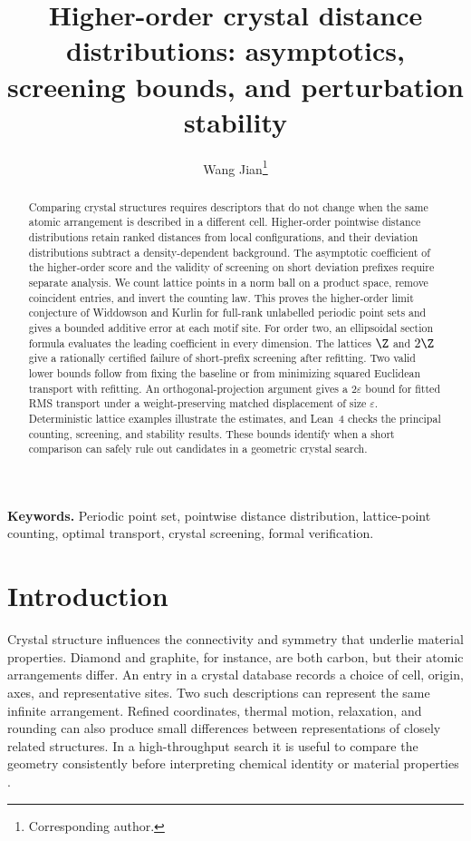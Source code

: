 \documentclass[11pt,a4paper]{article}
\title{Higher-order crystal distance distributions: asymptotics, screening bounds, and perturbation stability}
\author{Wang Jian\thanks{Corresponding author.}}
\date{}
\theoremstyle{definition}
\begin{document}
\maketitle

\begin{abstract}
Comparing crystal structures requires descriptors that do not change when the same atomic arrangement is described in a different cell. Higher-order pointwise distance distributions retain ranked distances from local configurations, and their deviation distributions subtract a density-dependent background. The asymptotic coefficient of the higher-order score and the validity of screening on short deviation prefixes require separate analysis. We count lattice points in a norm ball on a product space, remove coincident entries, and invert the counting law. This proves the higher-order limit conjecture of Widdowson and Kurlin for full-rank unlabelled periodic point sets and gives a bounded additive error at each motif site. For order two, an ellipsoidal section formula evaluates the leading coefficient in every dimension. The lattices \(\Z\) and \(2\Z\) give a rationally certified failure of short-prefix screening after refitting. Two valid lower bounds follow from fixing the baseline or from minimizing squared Euclidean transport with refitting. An orthogonal-projection argument gives a \(2\varepsilon\) bound for fitted RMS transport under a weight-preserving matched displacement of size \(\varepsilon\). Deterministic lattice examples illustrate the estimates, and Lean~4 checks the principal counting, screening, and stability results. These bounds identify when a short comparison can safely rule out candidates in a geometric crystal search.
\end{abstract}

\noindent\textbf{Keywords.} Periodic point set, pointwise distance distribution, lattice-point counting, optimal transport, crystal screening, formal verification.

\section{Introduction}\label{sec:intro}

Crystal structure influences the connectivity and symmetry that underlie material properties. Diamond and graphite, for instance, are both carbon, but their atomic arrangements differ. An entry in a crystal database records a choice of cell, origin, axes, and representative sites. Two such descriptions can represent the same infinite arrangement. Refined coordinates, thermal motion, relaxation, and rounding can also produce small differences between representations of closely related structures. In a high-throughput search it is useful to compare the geometry consistently before interpreting chemical identity or material properties \cite{wkpdd,wkhigher}.
\end{document}
